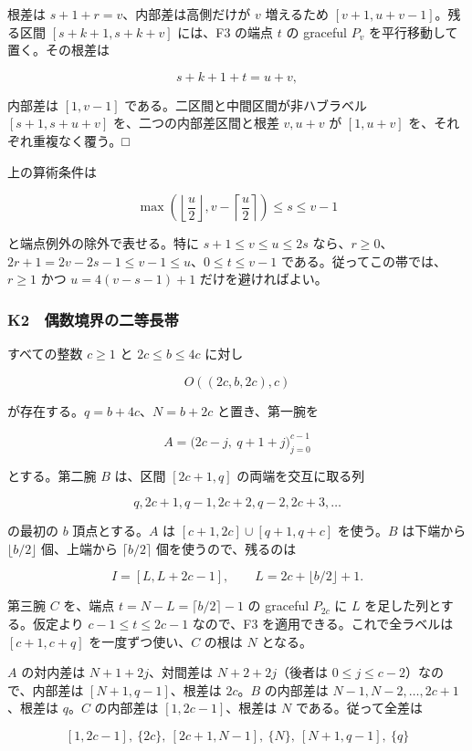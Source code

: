 \documentclass[
  10pt,
  a4paper,
]{article}
\begin{document}
根差は \(s+1+r=v\)、内部差は高側だけが \(v\) 増えるため
\([v+1,u+v-1]\)。残る区間 \([s+k+1,s+k+v]\) には、F3 の端点 \(t\) の
graceful \(P_v\) を平行移動して置く。その根差は

\[
s+k+1+t=u+v,
\]

内部差は \([1,v-1]\) である。二区間と中間区間が非ハブラベル
\([s+1,s+u+v]\) を、二つの内部差区間と根差 \(v,u+v\) が \([1,u+v]\)
を、それぞれ重複なく覆う。□

上の算術条件は

\[
\max\left(\left\lfloor\frac u2\right\rfloor,
v-\left\lceil\frac u2\right\rceil\right)\le s\le v-1
\]

と端点例外の除外で表せる。特に \(s+1\le v\le u\le2s\)
なら、\(r\ge0\)、\(2r+1=2v-2s-1\le v-1\le u\)、\(0\le t\le v-1\)
である。従ってこの帯では、\(r\ge1\) かつ \(u=4(v-s-1)+1\)
だけを避ければよい。

\subsubsection{K2　偶数境界の二等長帯}\label{k2-ux5076ux6570ux5883ux754cux306eux4e8cux7b49ux9577ux5e2f}

すべての整数 \(c\ge1\) と \(2c\le b\le4c\) に対し

\[
O((2c,b,2c),c)
\]

が存在する。\(q=b+4c\)、\(N=b+2c\) と置き、第一腕を

\[
A=\bigl(2c-j,\ q+1+j\bigr)_{j=0}^{c-1}
\]

とする。第二腕 \(B\) は、区間 \([2c+1,q]\) の両端を交互に取る列

\[
q,2c+1,q-1,2c+2,q-2,2c+3,\ldots
\]

の最初の \(b\) 頂点とする。\(A\) は \([c+1,2c]\cup[q+1,q+c]\)
を使う。\(B\) は下端から \(\lfloor b/2\rfloor\) 個、上端から
\(\lceil b/2\rceil\) 個を使うので、残るのは

\[
I=[L,L+2c-1],\qquad L=2c+\lfloor b/2\rfloor+1.
\]

第三腕 \(C\) を、端点 \(t=N-L=\lceil b/2\rceil-1\) の graceful
\(P_{2c}\) に \(L\) を足した列とする。仮定より \(c-1\le t\le2c-1\)
なので、F3 を適用できる。これで全ラベルは \([c+1,c+q]\)
を一度ずつ使い、\(C\) の根は \(N\) となる。

\(A\) の対内差は \(N+1+2j\)、対間差は \(N+2+2j\)（後者は
\(0\le j\le c-2\)）なので、内部差は \([N+1,q-1]\)、根差は \(2c\)。\(B\)
の内部差は \(N-1,N-2,\ldots,2c+1\)、根差は \(q\)。\(C\) の内部差は
\([1,2c-1]\)、根差は \(N\) である。従って全差は

\[
[1,2c-1],\ \{2c\},\ [2c+1,N-1],\ \{N\},\ [N+1,q-1],\ \{q\}
\]
\end{document}
